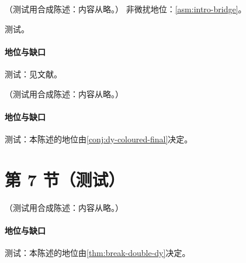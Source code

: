 \begin{theorem}\label{thm:break-double-dy}
（测试用合成陈述：内容从略。）
非微扰地位：\cref{asm:intro-bridge}。
\end{theorem}
\begin{proofsketch}测试。\end{proofsketch}
\paragraph{地位与缺口}测试：见文献。

\begin{conjecture}\label{conj:break-dps-coloured}
（测试用合成陈述：内容从略。）
\end{conjecture}
\paragraph{地位与缺口}测试：本陈述的地位由\cref{conj:dy-coloured-final}决定。

\section{第 7 节（测试）}\label{sec:break-summary}

\begin{conjecture}["口袋公式" $\sigma_{\rm DPS}=\sigma_A\sigma_B/\sigma_{\rm eff}$ \tagC]\label{conj:break-pocket}
（测试用合成陈述：内容从略。）
\end{conjecture}
\paragraph{地位与缺口}测试：本陈述的地位由\cref{thm:break-double-dy}决定。
